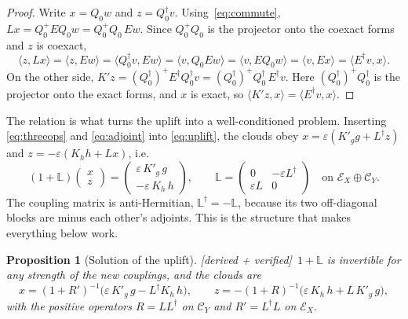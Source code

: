 \documentclass[11pt]{article}
\newcommand{\ip}[2]{\langle #1,#2\rangle}
\newcommand{\eps}{\varepsilon}
\newcommand{\Ec}{\mathcal E}
\newcommand{\Cc}{\mathcal C}
\newcommand{\LL}{\mathbb L}
\newcommand{\Kh}{K_h}
\newcommand{\Kg}{{K'_g}}
\newcommand{\tagbox}[2]{\textsf{\small\color{#1}[#2]}}
\newcommand{\VER}{\tagbox{cder}{derived + verified}}
\theoremstyle{plain}
\newtheorem{proposition}{Proposition}
\theoremstyle{remark}
\numberwithin{equation}{section}
\begin{document}
\begin{proof}
Write $x=Q_0w$ and $z=Q_0^\dagger v$. Using~\eqref{eq:commute}, $Lx=Q_0^+EQ_0w=Q_0^+Q_0\,Ew$. Since $Q_0^+Q_0$ is the
projector onto the coexact forms and $z$ is coexact,
\[
\ip{z}{Lx}=\ip{z}{Ew}=\ip{Q_0^\dagger v}{Ew}=\ip{v}{Q_0Ew}=\ip{v}{EQ_0w}=\ip{v}{Ex}=\ip{E^\dagger v}{x}.
\]
On the other side, $K'z=(Q_0^\dagger)^+E^\dagger Q_0^\dagger v=(Q_0^\dagger)^+Q_0^\dagger\,E^\dagger v$. Here
$(Q_0^\dagger)^+Q_0^\dagger$ is the projector onto the exact forms, and $x$ is exact, so
$\ip{K'z}{x}=\ip{E^\dagger v}{x}$.
\end{proof}

The relation is what turns the uplift into a well-conditioned problem. Inserting \eqref{eq:threeops} and
\eqref{eq:adjoint} into \eqref{eq:uplift}, the clouds obey $x=\eps(\Kg g+L^\dagger z)$ and $z=-\eps(\Kh h+Lx)$, i.e.
\begin{equation}\label{eq:system}
(1+\LL)\begin{pmatrix}x\\ z\end{pmatrix}=\begin{pmatrix}\eps\,\Kg\,g\\ -\eps\,\Kh\,h\end{pmatrix},
\qquad
\LL=\begin{pmatrix}0&-\eps L^\dagger\\ \eps L&0\end{pmatrix}\quad\text{on }\Ec_X\oplus\Cc_Y .
\end{equation}
The coupling matrix is anti-Hermitian, $\LL^\dagger=-\LL$, because its two off-diagonal blocks are minus each other's
adjoints. This is the structure that makes everything below work.

\begin{proposition}[Solution of the uplift]\label{prop:solve}\VER\
$1+\LL$ is invertible for any strength of the new couplings, and the clouds are
\begin{equation}\label{eq:xz}
x=(1+R')^{-1}\big(\eps\,\Kg\,g-L^\dagger\Kh\,h\big),\qquad
z=-(1+R)^{-1}\big(\eps\,\Kh\,h+L\,\Kg\,g\big),
\end{equation}
with the positive operators $R=LL^\dagger$ on $\Cc_Y$ and $R'=L^\dagger L$ on $\Ec_X$.
\end{proposition}
\end{document}
